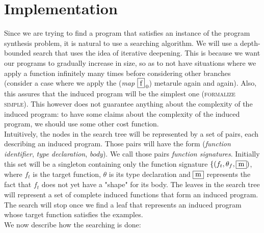 \chapter{Implementation}
Since we are trying to find a program that satisfies an instance of the program synthesis problem, it is natural to use a searching algorithm. We will use a depth-bounded search that uses the idea of iterative deepening. This is because we want our programs to gradually increase in size, so as to not have situations where we apply a function infinitely many times before considering other branches (consider a case where we apply the (\textit{map $\fbox{f}_{\,0}$}) metarule again and again). Also, this assures that the induced program will be the simplest one (\textsc{formalize simple}). This however does not guarantee anything about the complexity of the induced program: to have some claims about the complexity of the induced program, we should use some other cost function.
\\
Intuitively, the nodes in the search tree will be represented by a set of pairs, each describing an induced program. Those pairs will have the form  (\textit{function identifier}, \textit{type declaration}, \textit{body}). We call those pairs \textit{function signatures}. Initially this set will be a singleton containing only the function signature $\{(f_{t}, \theta_{f}, \fbox{m})$, where $f_{t}$ is the target function, $\theta$ is its type declaration and $\fbox{m}$ represents the fact that $f_{t}$ does not yet have a "shape" for its body. The leaves in the search tree will represent a set of complete induced functions that form an induced program. The search will stop once we find a leaf that represents an induced program whose target function satisfies the examples.
\\
We now describe how the searching is done:
